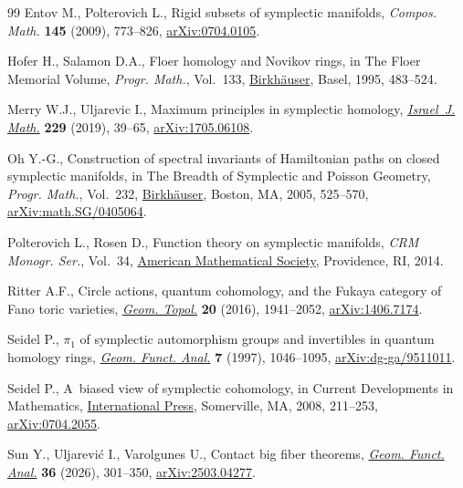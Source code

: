 \documentclass[10pt,a4paper]{amsart}
\numberwithin{equation}{section}
\theoremstyle{definition}
\begin{document}
\begin{thebibliography}{99}
Entov M., Polterovich L., Rigid subsets of symplectic manifolds,
\textit{Compos. Math.}
 \textbf{145} (2009), 773--826,
 \href{http://arxiv.org/abs/0704.0105}{arXiv:0704.0105}.

Hofer H., Salamon D.A., Floer homology and {N}ovikov rings, in The {F}loer
 Memorial Volume, \textit{Progr. Math.}, Vol.~133,
 \href{https://doi.org/10.1007/978-3-0348-9217-9_20}{Birkh\"auser}, Basel,
 1995, 483--524.

Merry W.J., Uljarevic I., Maximum principles in symplectic homology,
 \href{https://doi.org/10.1007/s11856-018-1792-z}{\textit{Israel~J. Math.}}
 \textbf{229} (2019), 39--65,
 \href{http://arxiv.org/abs/1705.06108}{arXiv:1705.06108}.

Oh Y.-G., Construction of spectral invariants of {H}amiltonian paths on closed
 symplectic manifolds, in The Breadth of Symplectic and {P}oisson Geometry,
 \textit{Progr. Math.}, Vol.~232,
 \href{https://doi.org/10.1007/0-8176-4419-9_18}{Birkh\"auser}, Boston, MA,
 2005, 525--570,
 \href{http://arxiv.org/abs/math.SG/0405064}{arXiv:math.SG/0405064}.

Polterovich L., Rosen D., Function theory on symplectic manifolds,
 \textit{{CRM} Monogr. Ser.}, Vol.~34,
 \href{https://doi.org/10.1090/crmm/034}{American Mathematical Society},
 Providence, RI, 2014.

Ritter A.F., Circle actions, quantum cohomology, and the {F}ukaya category of
 {F}ano toric varieties,
 \href{https://doi.org/10.2140/gt.2016.20.1941}{\textit{Geom. Topol.}}
 \textbf{20} (2016), 1941--2052,
 \href{http://arxiv.org/abs/1406.7174}{arXiv:1406.7174}.

Seidel P., {$\pi_1$} of symplectic automorphism groups and invertibles in
 quantum homology rings,
 \href{https://doi.org/10.1007/s000390050037}{\textit{Geom. Funct. Anal.}}
 \textbf{7} (1997), 1046--1095,
 \href{http://arxiv.org/abs/dg-ga/9511011}{arXiv:dg-ga/9511011}.

Seidel P., A~biased view of symplectic cohomology, in Current Developments in
 Mathematics,
 \href{https://doi.org/10.4310/CDM.2006.v2006.n1.a4}{International Press},
 Somerville, MA, 2008, 211--253,
 \href{http://arxiv.org/abs/0704.2055}{arXiv:0704.2055}.

Sun Y., Uljarevi\'c I., Varolgunes U., Contact big fiber theorems,
 \href{https://doi.org/10.1007/s00039-026-00734-4}{\textit{Geom. Funct.
 Anal.}} \textbf{36} (2026), 301--350,
 \href{http://arxiv.org/abs/2503.04277}{arXiv:2503.04277}.


\end{thebibliography}
\end{document}
